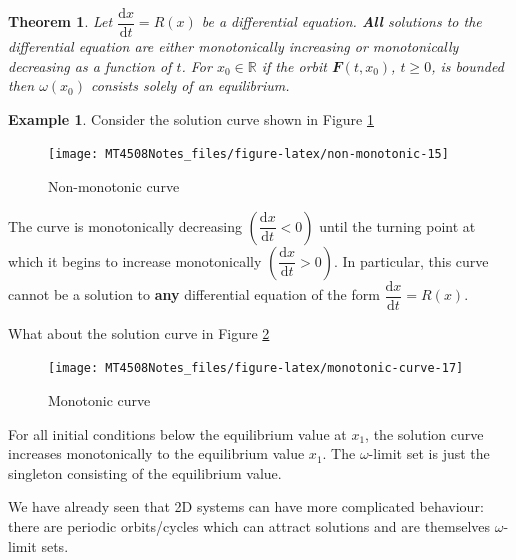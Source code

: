 \documentclass[
  a4paper,
  oneside,
  final]{krantz}
\newcommand{\R}{\mathbb{R}}
\renewcommand{\d}{\mathrm{d}}
\renewcommand{\v}[1]{{\mathbfit{#1}}}
\newcommand{\der}[2]{\dfrac{\d #1}{\d #2}}
\newtheorem{theorem}{Theorem}[chapter]
\theoremstyle{definition}
\theoremstyle{definition}
\newtheorem{example}{Example}[chapter]
\theoremstyle{definition}
\theoremstyle{definition}
\theoremstyle{remark}
\begin{document}
\begin{theorem}
\protect\hypertarget{thm:omega-limit-sets-1D}{}\label{thm:omega-limit-sets-1D}Let \(\der{x}{t} = R(x)\) be a differential equation. \textbf{All} solutions to the differential equation are either monotonically increasing or monotonically decreasing as a function of \(t\). For \(x_0 \in \R\) if the orbit \(\v{F}(t, x_0)\), \(t \ge 0\), is bounded then \(\omega(x_0)\) consists solely of an equilibrium.
\end{theorem}

\begin{example}
\protect\hypertarget{exm:example-and-non-example}{}\label{exm:example-and-non-example}Consider the solution curve shown in Figure \ref{fig:non-monotonic}

\begin{figure}

{\centering \texttt{[image: MT4508Notes\_files/figure-latex/non-monotonic-15]} 

}

\caption{Non-monotonic curve}\label{fig:non-monotonic}
\end{figure}

The curve is monotonically decreasing \(\left(\der{x}{t}<0\right)\) until the turning point at which it begins to increase monotonically \(\left(\der{x}{t}>0\right)\). In particular, this curve cannot be a solution to \textbf{any} differential equation of the form \(\der{x}{t} = R(x)\).

What about the solution curve in Figure \ref{fig:monotonic-curve}

\begin{figure}

{\centering \texttt{[image: MT4508Notes\_files/figure-latex/monotonic-curve-17]} 

}

\caption{Monotonic curve}\label{fig:monotonic-curve}
\end{figure}

For all initial conditions below the equilibrium value at \(x_1\), the solution curve increases monotonically to the equilibrium value \(x_1\). The \(\omega\)-limit set is just the singleton consisting of the equilibrium value.
\end{example}

We have already seen that 2D systems can have more complicated behaviour: there are periodic orbits/cycles which can attract solutions and are themselves \(\omega\)-limit sets.
\end{document}
